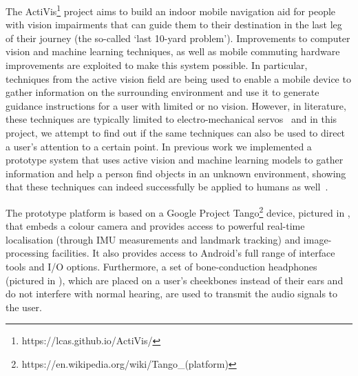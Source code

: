 \documentclass[]{interact}
\begin{document}
The ActiVis\footnote{https://lcas.github.io/ActiVis/} project aims to build an indoor mobile navigation aid for people with vision impairments that can guide them to their destination in the last leg of their journey (the so-called `last 10-yard problem').
Improvements to computer vision and machine learning techniques, as well as mobile commuting hardware improvements are exploited to make this system possible.
In particular, techniques from the active vision field are being used to enable a mobile device to gather information on the surrounding environment and use it to generate guidance instructions for a user with limited or no vision.
However, in literature, these techniques are typically limited to electro-mechanical servos~\citep{bajcsy2018revisiting} and in this project, we attempt to find out if the same techniques can also be used to direct a user's attention to a certain point. 
In previous work we implemented a prototype system that uses active vision and machine learning models to gather information and help a person find objects in an unknown environment, showing that these techniques can indeed successfully be applied to humans as well~\citep{lock2019active}.

The prototype platform is based on a Google Project Tango\footnote{https://en.wikipedia.org/wiki/Tango\_(platform)} device, pictured in , that embeds a colour camera and provides access to powerful real-time localisation (through IMU measurements and landmark tracking) and image-processing facilities. 
It also provides access to Android's full range of interface tools and I/O options. 
Furthermore, a set of bone-conduction headphones (pictured in ), which are placed on a user's cheekbones instead of their ears and do not interfere with normal hearing, are used to transmit the audio signals to the user.
\end{document}
